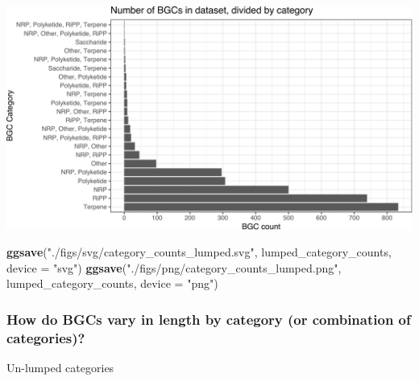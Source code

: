 \documentclass[
]{article}
\newenvironment{Shaded}{\begin{snugshade}}{\end{snugshade}}
\newcommand{\AttributeTok}[1]{\textcolor[rgb]{0.13,0.29,0.53}{#1}}
\newcommand{\FunctionTok}[1]{\textcolor[rgb]{0.13,0.29,0.53}{\textbf{#1}}}
\newcommand{\NormalTok}[1]{#1}
\newcommand{\StringTok}[1]{\textcolor[rgb]{0.31,0.60,0.02}{#1}}
\begin{document}
\includegraphics{analysis_files/figure-latex/unnamed-chunk-8-1.pdf}

\begin{Shaded}
\begin{Highlighting}[]
\FunctionTok{ggsave}\NormalTok{(}\StringTok{"./figs/svg/category\_counts\_lumped.svg"}\NormalTok{, lumped\_category\_counts, }\AttributeTok{device =} \StringTok{"svg"}\NormalTok{)}
\FunctionTok{ggsave}\NormalTok{(}\StringTok{"./figs/png/category\_counts\_lumped.png"}\NormalTok{, lumped\_category\_counts, }\AttributeTok{device =} \StringTok{"png"}\NormalTok{)}
\end{Highlighting}
\end{Shaded}

\hypertarget{how-do-bgcs-vary-in-length-by-category-or-combination-of-categories}{%
\subsubsection{How do BGCs vary in length by category (or combination of
categories)?}\label{how-do-bgcs-vary-in-length-by-category-or-combination-of-categories}}

Un-lumped categories
\end{document}
